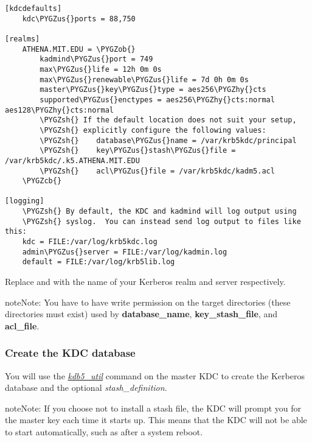 \documentclass[letterpaper,10pt,english]{sphinxmanual}
\def\PYGZus{\char`\_}
\def\PYGZob{\char`\{}
\def\PYGZcb{\char`\}}
\def\PYGZsh{\char`\#}
\def\PYGZhy{\char`\-}
\begin{document}
\begin{Verbatim}[commandchars=\\\{\}]
[kdcdefaults]
    kdc\PYGZus{}ports = 88,750

[realms]
    ATHENA.MIT.EDU = \PYGZob{}
        kadmind\PYGZus{}port = 749
        max\PYGZus{}life = 12h 0m 0s
        max\PYGZus{}renewable\PYGZus{}life = 7d 0h 0m 0s
        master\PYGZus{}key\PYGZus{}type = aes256\PYGZhy{}cts
        supported\PYGZus{}enctypes = aes256\PYGZhy{}cts:normal aes128\PYGZhy{}cts:normal
        \PYGZsh{} If the default location does not suit your setup,
        \PYGZsh{} explicitly configure the following values:
        \PYGZsh{}    database\PYGZus{}name = /var/krb5kdc/principal
        \PYGZsh{}    key\PYGZus{}stash\PYGZus{}file = /var/krb5kdc/.k5.ATHENA.MIT.EDU
        \PYGZsh{}    acl\PYGZus{}file = /var/krb5kdc/kadm5.acl
    \PYGZcb{}

[logging]
    \PYGZsh{} By default, the KDC and kadmind will log output using
    \PYGZsh{} syslog.  You can instead send log output to files like this:
    kdc = FILE:/var/log/krb5kdc.log
    admin\PYGZus{}server = FILE:/var/log/kadmin.log
    default = FILE:/var/log/krb5lib.log
\end{Verbatim}

Replace  and  with the name of
your Kerberos realm and server respectively.

\begin{notice}{note}{Note:}
You have to have write permission on the target directories
(these directories must exist) used by \textbf{database\_name},
\textbf{key\_stash\_file}, and \textbf{acl\_file}.
\end{notice}


\subsubsection{Create the KDC database}
\label{admin/install_kdc:create-the-kdc-database}\label{admin/install_kdc:create-db}
You will use the {\hyperref[admin/admin_commands/kdb5_util:kdb5-util-8]{\emph{kdb5\_util}}} command on the master KDC to
create the Kerberos database and the optional \emph{stash\_definition}.

\begin{notice}{note}{Note:}
If you choose not to install a stash file, the KDC will
prompt you for the master key each time it starts up.  This
means that the KDC will not be able to start automatically,
such as after a system reboot.
\end{notice}
\end{document}
